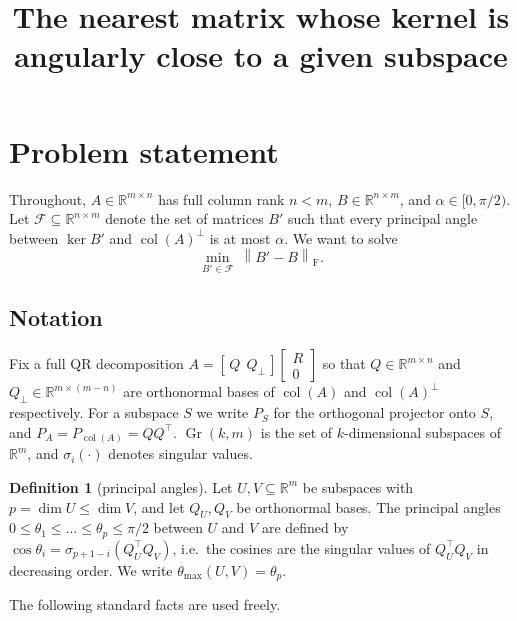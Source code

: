 \documentclass[11pt]{article}
\title{The nearest matrix whose kernel is angularly close to a given subspace}
\author{}
\date{}
\theoremstyle{definition}
\newtheorem{definition}[theorem]{Definition}
\newcommand{\R}{\mathbb{R}}
\newcommand{\col}{\operatorname{col}}
\newcommand{\Gr}{\operatorname{Gr}}
\newcommand{\norm}[1]{\left\lVert #1 \right\rVert}
\newcommand{\Fro}{\mathrm{F}}
\newcommand{\Qp}{Q_{\perp}}
\newcommand{\Ff}{\mathcal{F}}
\begin{document}
\maketitle

\section{Problem statement}

Throughout, $A\in\R^{m\times n}$ has full column rank $n<m$, $B\in\R^{n\times m}$, and $\alpha\in[0,\pi/2)$.
Let $\Ff\subseteq\R^{n\times m}$ denote the set of matrices $B'$ such that every principal angle between $\ker B'$ and $\col(A)^\perp$ is at most $\alpha$.
We want to solve
\begin{equation}\label{eq:main}
  \min_{B'\in\Ff}\ \norm{B'-B}_\Fro .
\end{equation}

\subsection*{Notation}
Fix a full QR decomposition $A=[\,Q\ \ \Qp\,]\begin{bmatrix}R\\0\end{bmatrix}$ so that $Q\in\R^{m\times n}$ and $\Qp\in\R^{m\times(m-n)}$ are orthonormal bases of $\col(A)$ and $\col(A)^\perp$ respectively.
For a subspace $S$ we write $P_S$ for the orthogonal projector onto $S$, and $P_A=P_{\col(A)}=QQ^\top$.
$\Gr(k,m)$ is the set of $k$-dimensional subspaces of $\R^m$, and $\sigma_i(\cdot)$ denotes singular values.

\begin{definition}[principal angles]
Let $U,V\subseteq\R^m$ be subspaces with $p=\dim U\le \dim V$, and let $Q_U,Q_V$ be orthonormal bases.
The principal angles $0\le\theta_1\le\dots\le\theta_p\le\pi/2$ between $U$ and $V$ are defined by
$\cos\theta_i=\sigma_{p+1-i}(Q_U^\top Q_V)$, i.e.\ the cosines are the singular values of $Q_U^\top Q_V$ in decreasing order.
We write $\theta_{\max}(U,V)=\theta_p$.
\end{definition}

The following standard facts are used freely.
\end{document}
